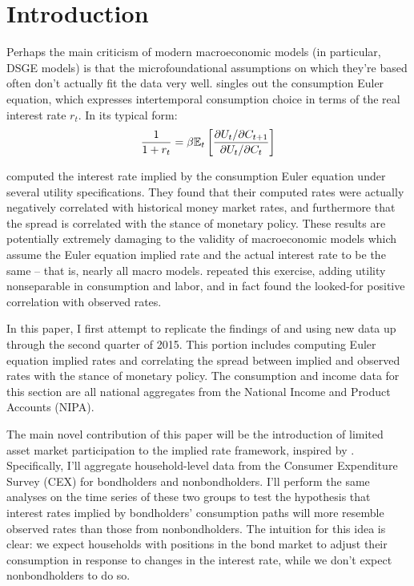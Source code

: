 \section{Introduction}
Perhaps the main criticism of modern macroeconomic models (in particular, DSGE models) is that the microfoundational assumptions on which they're based often don't actually fit the data very well. \cite{smith14} singles out the consumption Euler equation, which expresses intertemporal consumption choice in terms of the real interest rate $r_t$. In its typical form: $$\frac{1}{1 + r_t} = \beta \mathbb{E}_t \left[  \frac{\partial U_t / \partial C_{t+1}}{\partial U_t / \partial C_t}  \right]$$

\cite{canzoneri07} computed the interest rate implied by the consumption Euler equation under several utility specifications. They found that their computed rates were actually negatively correlated with historical money market rates, and furthermore that the spread is correlated with the stance of monetary policy. These results are potentially extremely damaging to the validity of macroeconomic models which assume the Euler equation implied rate and the actual interest rate to be the same -- that is, nearly all macro models. \cite{collard11} repeated this exercise, adding utility nonseparable in consumption and labor, and in fact found the looked-for positive correlation with observed rates.

In this paper, I first attempt to replicate the findings of \cite{canzoneri07} and \cite{collard11} using new data up through the second quarter of 2015.  This portion includes computing Euler equation implied rates and correlating the spread between implied and observed rates with the stance of monetary policy. The consumption and income data for this section are all national aggregates from the National Income and Product Accounts (NIPA).

The main novel contribution of this paper will be the introduction of limited asset market participation to the implied rate framework, inspired by \cite{vissing02}. Specifically, I'll aggregate household-level data from the Consumer Expenditure Survey (CEX) for bondholders and nonbondholders. I'll perform the same analyses on the time series of these two groups to test the hypothesis that interest rates implied by bondholders' consumption paths will more resemble observed rates than those from nonbondholders. The intuition for this idea is clear: we expect households with positions in the bond market to adjust their consumption in response to changes in the interest rate, while we don't expect nonbondholders to do so.

